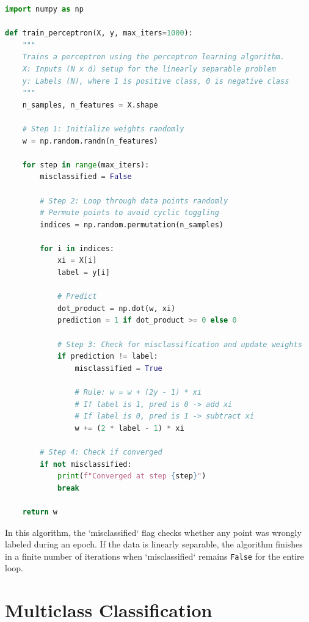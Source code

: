 \begin{lstlisting}[language=Python, caption={Perceptron Training Algorithm}]
import numpy as np

def train_perceptron(X, y, max_iters=1000):
    """
    Trains a perceptron using the perceptron learning algorithm.
    X: Inputs (N x d) setup for the linearly separable problem
    y: Labels (N), where 1 is positive class, 0 is negative class
    """
    n_samples, n_features = X.shape
    
    # Step 1: Initialize weights randomly
    w = np.random.randn(n_features)
    
    for step in range(max_iters):
        misclassified = False
        
        # Step 2: Loop through data points randomly
        # Permute points to avoid cyclic toggling
        indices = np.random.permutation(n_samples)
        
        for i in indices:
            xi = X[i]
            label = y[i]
            
            # Predict
            dot_product = np.dot(w, xi)
            prediction = 1 if dot_product >= 0 else 0
            
            # Step 3: Check for misclassification and update weights
            if prediction != label:
                misclassified = True
                
                # Rule: w = w + (2y - 1) * xi
                # If label is 1, pred is 0 -> add xi
                # If label is 0, pred is 1 -> subtract xi
                w += (2 * label - 1) * xi
                
        # Step 4: Check if converged
        if not misclassified:
            print(f"Converged at step {step}")
            break
            
    return w
\end{lstlisting}

In this algorithm, the `misclassified` flag checks whether any point was wrongly labeled during an epoch. If the data is linearly separable, the algorithm finishes in a finite number of iterations when `misclassified` remains \texttt{False} for the entire loop.


\section{Multiclass Classification}

